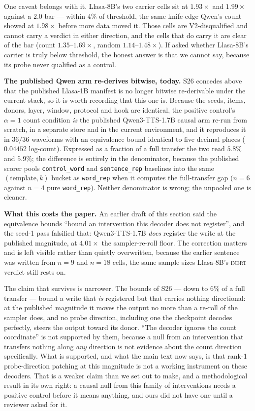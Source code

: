 \documentclass[11pt]{article}
\begin{document}
One caveat belongs with it. Llasa-8B's two carrier cells sit at $1.93\times$ and
$1.99\times$ against a $2.0$ bar --- within $4\%$ of threshold, the same
knife-edge Qwen's count showed at $1.98\times$ before more data moved it. Those
cells are V2-disqualified and cannot carry a verdict in either direction, and the
cells that do carry it are clear of the bar (count $1.35$--$1.69\times$, random
$1.14$--$1.48\times$). If asked whether Llasa-8B's carrier is truly below
threshold, the honest answer is that we cannot say, because its probe never
qualified as a control.

\textbf{The published Qwen arm re-derives bitwise, today.} S26 concedes above
that the published Llasa-1B manifest is no longer bitwise re-derivable under the
current stack, so it is worth recording that this one is. Because the seeds,
items, donors, layer, window, protocol and hook are identical, the positive
control's $\alpha{=}1$ count condition \emph{is} the published Qwen3-TTS-1.7B
causal arm re-run from scratch, in a separate store and in the current
environment, and it reproduces it in $36/36$ waveforms with an equivalence bound
identical to five decimal places ($0.04452$ log-count). Expressed as a fraction
of a full transfer the two read $5.8\%$ and $5.9\%$; the difference is entirely
in the denominator, because the published scorer pools \texttt{control\_word} and
\texttt{sentence\_rep} baselines into the same $(\text{template}, k)$ bucket as
\texttt{word\_rep} when it computes the full-transfer gap ($n{=}6$ against $n{=}4$
pure \texttt{word\_rep}). Neither denominator is wrong; the unpooled one is
cleaner.

\textbf{What this costs the paper.} An earlier draft of this section said the
equivalence bounds ``bound an intervention this decoder does not register'', and
the seed-1 pass falsified that: Qwen3-TTS-1.7B \emph{does} register the write at
the published magnitude, at $4.01\times$ the sampler-re-roll floor. The
correction matters and is left visible rather than quietly overwritten, because
the earlier sentence was written from $n{=}9$ and $n{=}18$ cells, the same
sample sizes Llasa-8B's \textsc{inert} verdict still rests on.

The claim that survives is narrower. The bounds of S26 --- down to $6\%$ of a
full transfer --- bound a write that \emph{is} registered but that carries
nothing directional: at the published magnitude it moves the output no more than
a re-roll of the sampler does, and no probe direction, including one the
checkpoint decodes perfectly, steers the output toward its donor. ``The decoder
ignores the count coordinate'' is not supported by them, because a null from an
intervention that transfers nothing along \emph{any} direction is not evidence
about the count direction specifically. What is supported, and what the main
text now says, is that rank-1 probe-direction patching at this magnitude is not
a working instrument on these decoders. That is a weaker claim than we set out to make,
and a methodological result in its own right: a causal null from this family of
interventions needs a positive control before it means anything, and ours did
not have one until a reviewer asked for it.
\end{document}
